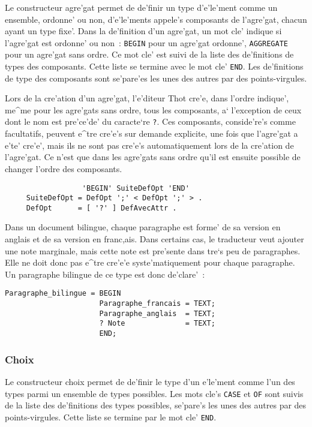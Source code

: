 {Le constructeur agre'gat permet de de'finir un type d'e'le'ment comme un
ensemble, ordonne' ou non, d'e'le'ments appele's composants de l'agre'gat,
chacun ayant un type fixe'.
Dans la de'finition d'un agre'gat, un mot cle' indique si l'agre'gat est
ordonne' ou non~: {\tt BEGIN} pour un agre'gat ordonne', {\tt AGGREGATE}
pour un agre'gat sans ordre.
Ce mot cle' est suivi de la liste des de'finitions de types des composants.
Cette liste se termine avec le mot cle' {\tt END}. Les de'finitions
de type des composants sont se'pare'es les unes des autres par des
points-virgules.

Lors de la cre'ation d'un agre'gat, l'e'diteur Thot cre'e, dans l'ordre
indique', me^me pour les agre'gats sans ordre, tous les composants, a`
l'exception de ceux dont le nom est pre'ce'de' du caracte`re {\tt ?}.
Ces composants, conside're's comme facultatifs, peuvent e^tre cre'e's
sur demande explicite, une fois que l'agre'gat a e'te' cre'e', mais
ils ne sont pas cre'e's automatiquement lors de la cre'ation de l'agre'gat.
Ce n'est que dans les agre'gats sans ordre qu'il est ensuite possible de
changer l'ordre des composants.

\begin{verbatim}
                  'BEGIN' SuiteDefOpt 'END'
     SuiteDefOpt = DefOpt ';' < DefOpt ';' > .
     DefOpt      = [ '?' ] DefAvecAttr .
\end{verbatim}

\begin{example}
Dans un document bilingue, chaque paragraphe est forme' de sa version en
anglais et de sa version en franc,ais. Dans certains cas, le traducteur
veut ajouter une note marginale, mais cette note est pre'sente dans tre`s peu
de paragraphes. Elle ne doit donc pas e^tre cre'e'e syste'matiquement pour chaque
paragraphe. Un paragraphe bilingue de ce type est donc de'clare'~:

\begin{verbatim}
Paragraphe_bilingue = BEGIN
                      Paragraphe_francais = TEXT;
                      Paragraphe_anglais  = TEXT;
                      ? Note              = TEXT;
                      END;
\end{verbatim}
\end{example}

\subsubsection{Choix}

Le constructeur choix permet de de'finir le type d'un e'le'ment comme l'un
des types parmi un ensemble de types possibles. Les mots cle's {\tt CASE} et
{\tt OF} sont suivis de la liste des de'finitions des types possibles,
se'pare's les unes des autres par des points-virgules.
Cette liste se termine par le mot cle' {\tt END}.

}
